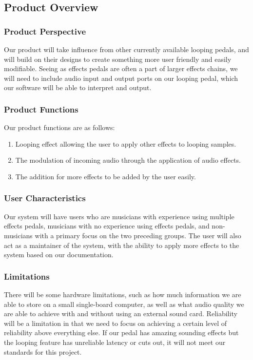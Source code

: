 \subsection{Product Overview}
    \subsubsection{Product Perspective}
    Our product will take influence from other currently available looping pedals, and will build on their designs to create something more user friendly and easily modifiable. 
    Seeing as effects pedals are often a part of larger effects chains, we will need to include audio input and output ports on our looping pedal, which our software will be able to interpret and output. 
    
    \subsubsection{Product Functions}
    Our product functions are as follows:
    \begin{enumerate}[label=\alph*.]
        \item Looping effect allowing the user to apply other effects to looping samples.
        \item The modulation of incoming audio through the application of audio effects.
        \item The addition for more effects to be added by the user easily.
    \end{enumerate}
    
    \subsubsection{User Characteristics}
    Our system will have users who are musicians with experience using multiple effects pedals, musicians with no experience using effects pedals, and non-musicians with a primary focus on the two preceding groups. The user will also act as a maintainer of the system, with the ability to apply more effects to the system based on our documentation. 
    
    \subsubsection{Limitations}
    There will be some hardware limitations, such as how much information we are able to store on a small single-board computer, as well as what audio quality we are able to achieve with and without using an external sound card. Reliability will be a limitation in that we need to focus on achieving a certain level of reliability above everything else. If our pedal has amazing sounding effects but the looping feature has unreliable latency or cuts out, it will not meet our standards for this project. 
    


